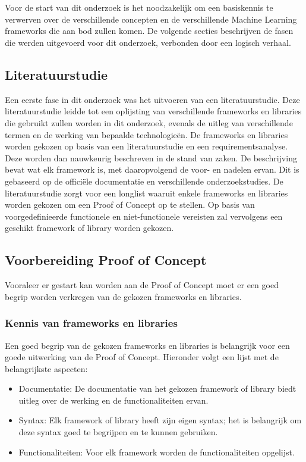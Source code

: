 
\chapter{}%
\label{ch:methodologie}

Voor de start van dit onderzoek is het noodzakelijk om een basiskennis te verwerven over de verschillende concepten en de verschillende Machine Learning frameworks die aan bod zullen komen. De volgende secties beschrijven de fasen die werden uitgevoerd voor dit onderzoek, verbonden door een logisch verhaal.
\section{Literatuurstudie}
Een eerste fase in dit onderzoek was het uitvoeren van een literatuurstudie. Deze literatuurstudie leidde tot een oplijsting van verschillende frameworks en libraries die gebruikt zullen worden in dit onderzoek, evenals de uitleg van verschillende termen en de werking van bepaalde technologieën. De frameworks en libraries worden gekozen op basis van een literatuurstudie en een requirementsanalyse. Deze worden dan nauwkeurig beschreven in de stand van zaken. De beschrijving bevat wat elk framework is, met daaropvolgend de voor- en nadelen ervan. Dit is gebaseerd op de officiële documentatie en verschillende onderzoekstudies.
De literatuurstudie zorgt voor een longlist waaruit enkele frameworks en libraries worden gekozen om een Proof of Concept op te stellen. Op basis van voorgedefinieerde functionele en niet-functionele vereisten zal vervolgens een geschikt framework of library worden gekozen.
\section{Voorbereiding Proof of Concept}
Vooraleer er gestart kan worden aan de Proof of Concept moet er een goed begrip worden verkregen van de gekozen frameworks en libraries.
\subsection{Kennis van frameworks en libraries}
Een goed begrip van de gekozen frameworks en libraries is belangrijk voor een goede uitwerking van de Proof of Concept. Hieronder volgt een lijst met de belangrijkste aspecten:
\begin{itemize}
  \item Documentatie: De documentatie van het gekozen framework of library biedt uitleg over de werking en de functionaliteiten ervan.
  \item Syntax: Elk framework of library heeft zijn eigen syntax; het is belangrijk om deze syntax goed te begrijpen en te kunnen gebruiken.
  \item Functionaliteiten: Voor elk framework worden de functionaliteiten opgelijst.
\end{itemize}
